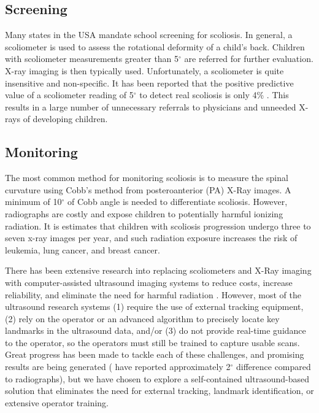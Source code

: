 \documentclass{article}
\begin{document}
\subsection{Screening}
\label{ssec:screen}
Many states in the USA mandate school screening for scoliosis. In general, a scoliometer is used to assess the rotational deformity of a child's back. Children with scoliometer measurements greater than 5$^\circ$ are referred for further evaluation. X-ray imaging is then typically used. Unfortunately, a scoliometer is quite insensitive and non-specific. It has been reported that the positive predictive value of a scoliometer reading of 5$^\circ$ to detect real scoliosis is only 4\% \cite{Yaw99}. This results in a large number of unnecessary referrals to physicians and unneeded X-rays of developing children.

\subsection{Monitoring}
\label{ssec:Monitoring}
 The most common method for monitoring scoliosis is to measure the spinal curvature using Cobb's method \cite{Cob48} from posteroanterior (PA) X-Ray images. A minimum of 10$^\circ$ of Cobb angle is needed to differentiate scoliosis.  However, radiographs are costly and expose children to potentially harmful ionizing radiation. It is estimates that children with scoliosis progression undergo three to seven x-ray images per year, and such radiation exposure increases the risk of leukemia, lung cancer, and breast cancer. \cite{Kno14}
 
There has been extensive research into replacing scoliometers and X-Ray imaging with computer-assisted ultrasound imaging systems to reduce costs, increase reliability, and eliminate the need for harmful radiation \cite{Li10, Che13, Ung14a}.  However, most of the ultrasound research systems (1) require the use of external tracking equipment, (2) rely on the operator or an advanced algorithm to precisely locate key landmarks in the ultrasound data, and/or (3) do not provide real-time guidance to the operator, so the operators must still be trained to capture usable scans.  Great progress has been made to tackle each of these challenges, and promising results are being generated (\cite{Che13, Ung14a} have reported approximately 2$^\circ$ difference compared to radiographs), but we have chosen to explore a self-contained ultrasound-based solution that eliminates the need for external tracking, landmark identification, or extensive operator training.
\end{document}
